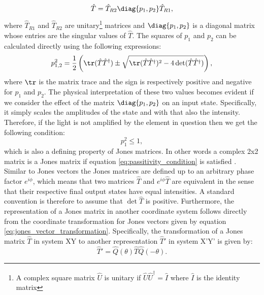 \begin{equation}
    \label{eq:jones_singular_value_decomposition}
    \hat{T} = \hat{T}_{R2}\diag{p_1, p_2}\hat{T}_{R1},
\end{equation}
where $\hat{T}_{R1}$ and $\hat{T}_{R2}$ are unitary\footnote{A complex square matrix $\hat{U}$ is unitary if $\hat{U} \hat{U}^\dagger=\hat{I}$ where $\hat{I}$ is the identity matrix} matrices and $\diag{p_1, p_2}$ is a diagonal matrix whose entries are the singular values of $\hat{T}$. The squares of $p_1$ and $p_2$ can be calculated directly using the following expressions:
\begin{equation}
    p_{1,2}^2 = \frac{1}{2}\left(\tr(\hat{T}\hat{T}^{\dagger}) \pm 
    \sqrt{\tr(\hat{T}\hat{T}^{\dagger})^2-4\det(\hat{T}\hat{T}^{\dagger})}\right),
\end{equation}
where $\tr$ is the matrix trace and the sign is respectively positive and negative for $p_1$ and $p_2$. The physical interpretation of these two values becomes evident if we consider the effect of the matrix $\diag{p_1, p_2}$ on an input state. Specifically, it simply scales the amplitudes of the state and with that also the intensity. Therefore, if the light is not amplified by the element in question then we get the following condition:
\begin{equation}
    \label{eq:passitivity_condition}
    p_1^2 \leq 1,
\end{equation}
which is also a defining property of Jones matrices. In other words a complex 2x2 matrix is a Jones matrix if equation \ref{eq:passitivity_condition} is satisfied \cite{Barakat1987}. Similar to Jones vectors the Jones matrices are defined up to an arbitrary phase factor $e^{i\phi}$, which means that two matrices $\hat{T}$ and $e^{i\phi}\hat{T}$ are equivalent in the sense that their respective final output states have equal intensities. A standard convention is therefore to assume that $\det \hat{T}$ is positive. Furthermore, the representation of a Jones matrix in another coordinate system follows directly from the coordinate transformation for Jones vectors given by equation \ref{eq:jones_vector_transformation}. Specifically, the transformation of a Jones matrix $\hat{T}$ in system XY to another representation $\hat{T}'$ in system X'Y' is given by:
\begin{equation}
    \label{eq:jones_matrix_transformation}
    \hat{T}' = \hat{Q}(\theta)\hat{T}\hat{Q}(-\theta).
\end{equation}
